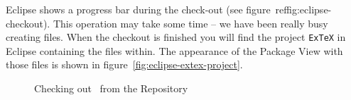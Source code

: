 \documentclass{extex-doc}
\begin{document}
Eclipse shows a progress bar during the check-out (see
figure~ref{fig:eclipse-checkout}). This operation may take some time
-- we have been really busy creating files. When the checkout is
finished you will find the project \texttt{ExTeX} in Eclipse
containing the files within. The appearance of the Package View with
those files is shown in figure~\ref{fig:eclipse-extex-project}.
\begin{figure}[htp]
  \hbox{}\hfill
  \hfill
  \caption{Checking out \ExTeX\ from the Repository}
\end{figure}
\end{document}
